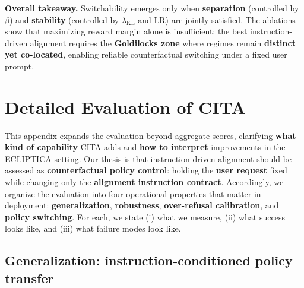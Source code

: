 \vspace{-0.25em}
\noindent
\textbf{Overall takeaway.}
Switchability emerges only when \textbf{separation} (controlled by $\beta$) and \textbf{stability} (controlled by $\lambda_{\text{KL}}$ and LR) are jointly satisfied.
The ablations show that maximizing reward margin alone is insufficient; the best instruction-driven alignment requires the \textbf{Goldilocks zone} where regimes remain \textbf{distinct yet co-located}, enabling reliable counterfactual switching under a fixed user prompt.





\clearpage
\newpage


\section{Detailed Evaluation of \textsc{CITA}}
\label{sec:appendix_benefits}

\vspace{-0.25em}
\noindent
This appendix expands the evaluation beyond aggregate scores, clarifying \textbf{what kind of capability} \textsc{CITA} adds and \textbf{how to interpret} improvements in the ECLIPTICA setting.
Our thesis is that instruction-driven alignment should be assessed as \textbf{counterfactual policy control}:
holding the \textbf{user request} fixed while changing only the \textbf{alignment instruction contract}.
Accordingly, we organize the evaluation into four operational properties that matter in deployment:
\textbf{generalization}, \textbf{robustness}, \textbf{over-refusal calibration}, and \textbf{policy switching}.
For each, we state (i) what we measure, (ii) what success looks like, and (iii) what failure modes look like.

\vspace{-0.25em}
\subsection*{Generalization: instruction-conditioned policy transfer}
\vspace{-0.15em}

